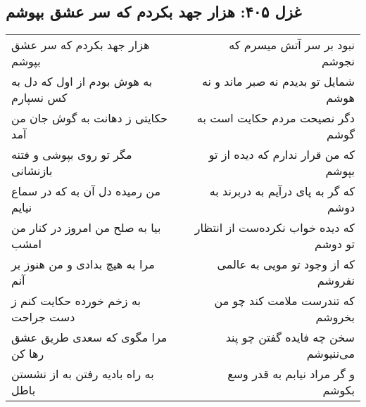 \begin{center}
\section*{غزل ۴۰۵: هزار جهد بکردم که سر عشق بپوشم}
\label{sec:405}
\begin{longtable}{l p{0.5cm} r}
هزار جهد بکردم که سر عشق بپوشم
&&
نبود بر سر آتش میسرم که نجوشم
\\
به هوش بودم از اول که دل به کس نسپارم
&&
شمایل تو بدیدم نه صبر ماند و نه هوشم
\\
حکایتی ز دهانت به گوش جان من آمد
&&
دگر نصیحت مردم حکایت است به گوشم
\\
مگر تو روی بپوشی و فتنه بازنشانی
&&
که من قرار ندارم که دیده از تو بپوشم
\\
من رمیده دل آن به که در سماع نیایم
&&
که گر به پای درآیم به دربرند به دوشم
\\
بیا به صلح من امروز در کنار من امشب
&&
که دیده خواب نکرده‌ست از انتظار تو دوشم
\\
مرا به هیچ بدادی و من هنوز بر آنم
&&
که از وجود تو مویی به عالمی نفروشم
\\
به زخم خورده حکایت کنم ز دست جراحت
&&
که تندرست ملامت کند چو من بخروشم
\\
مرا مگوی که سعدی طریق عشق رها کن
&&
سخن چه فایده گفتن چو پند می‌ننیوشم
\\
به راه بادیه رفتن به از نشستن باطل
&&
و گر مراد نیابم به قدر وسع بکوشم
\\
\end{longtable}
\end{center}
